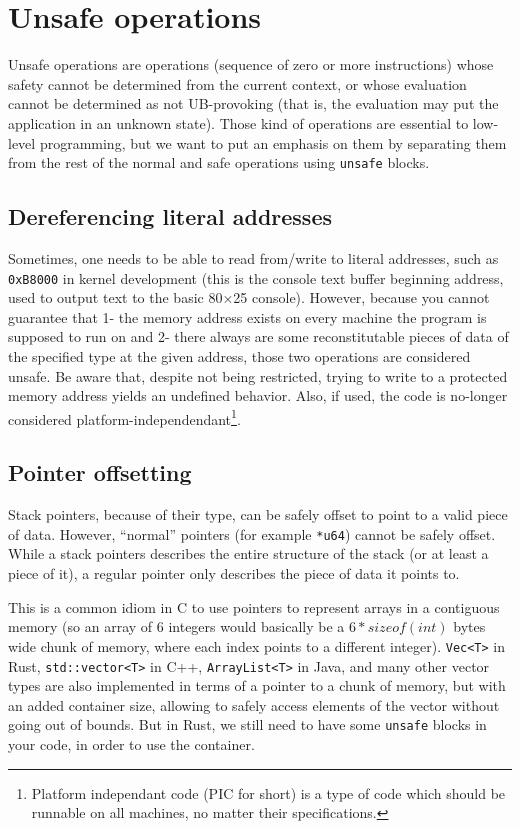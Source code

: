 \section{Unsafe operations}\label{sec:nstar-common-unsafe}

Unsafe operations are operations (sequence of zero or more instructions) whose safety cannot be determined from the current context, or whose evaluation cannot be determined as not UB-provoking (that is, the evaluation may put the application in an unknown state).
Those kind of operations are essential to low-level programming, but we want to put an emphasis on them by separating them from the rest of the normal and safe operations using \texttt{unsafe} blocks.

\subsection{Dereferencing literal addresses}\label{subsec:nstar-common-unsafe-derefliteraladdr}

Sometimes, one needs to be able to read from/write to literal addresses, such as \texttt{0xB8000} in kernel development (this is the console text buffer beginning address, used to output text to the basic 80×25 console).
However, because you cannot guarantee that 1- the memory address exists on every machine the program is supposed to run on and 2- there always are some reconstitutable pieces of data of the specified type at the given address, those two operations are considered unsafe.
Be aware that, despite not being restricted, trying to write to a protected memory address yields an undefined behavior.
Also, if used, the code is no-longer considered platform-independendant\footnote{Platform independant code (PIC for short) is a type of code which should be runnable on all machines, no matter their specifications.}.

\subsection{Pointer offsetting}\label{subsec:nstar-common-unsafe-ptroffset}

Stack pointers, because of their type, can be safely offset to point to a valid piece of data.
However, ``normal'' pointers (for example \texttt{*u64}) cannot be safely offset.
While a stack pointers describes the entire structure of the stack (or at least a piece of it), a regular pointer only describes the piece of data it points to.

This is a common idiom in C to use pointers to represent arrays in a contiguous memory (so an array of 6 integers would basically be a $6 * sizeof(int)$ bytes wide chunk of memory, where each index points to a different integer).
\texttt{Vec<T>} in Rust, \texttt{std::vector<T>} in C++, \texttt{ArrayList<T>} in Java, and many other vector types are also implemented in terms of a pointer to a chunk of memory, but with an added container size, allowing to safely access elements of the vector without going out of bounds.
But in Rust, we still need to have some \texttt{unsafe} blocks in your code, in order to use the container.

